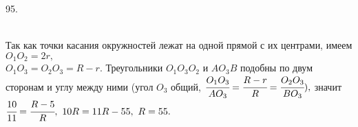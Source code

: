 95. \begin{figure}[ht!]
\end{figure}\\
Так как точки касания окружностей лежат на одной прямой с их центрами, имеем $O_1O_2=2r,$\\$O_1O_3=O_2O_3=R-r.$ Треугольники $O_1O_3O_2$ и $AO_3B$ подобны по двум сторонам и углу между ними (угол $O_3$ общий, $\cfrac{O_1O_3}{AO_3}=\cfrac{R-r}{R}=\cfrac{O_2O_3}{BO_3}),$ значит $\cfrac{10}{11}=\cfrac{R-5}{R},\ 10R=11R-55,\ R=55.$\\
